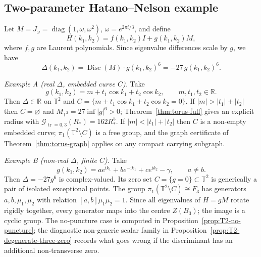 \documentclass[11pt]{article}
\numberwithin{equation}{section}
\DeclareMathOperator{\Disc}{Disc}
\DeclareMathOperator{\tr}{tr}
\DeclareMathOperator{\diag}{diag}
\newcommand{\bbR}{\mathbb R}
\newcommand{\bbT}{\mathbb T}
\newcommand{\cG}{\mathcal G}
\newcommand{\ii}{\mathrm i}
\begin{document}
\subsection{Two-parameter Hatano--Nelson example}

Let \(M=J_\omega=\diag(1,\omega,\omega^2)\), \(\omega=e^{2\pi i/3}\), and
define
\[
  H(k_1,k_2)=f(k_1,k_2)I+g(k_1,k_2)M,
\]
where \(f,g\) are Laurent polynomials.  Since eigenvalue differences
scale by \(g\), we have
\[
  \Delta(k_1,k_2)=\Disc(M)\cdot g(k_1,k_2)^6=-27\,g(k_1,k_2)^6.
\]

\emph{Example A (real \(\Delta\), embedded curve \(C\)).}
Take
\[
  g(k_1,k_2)=m+t_1\cos k_1+t_2\cos k_2,\qquad m,t_1,t_2\in\bbR.
\]
Then \(\Delta\in\bbR\) on \(\bbT^2\) and
\(C=\{m+t_1\cos k_1+t_2\cos k_2=0\}\).
If \(|m|>|t_1|+|t_2|\) then \(C=\varnothing\) and \(M_{\bbT^2}=27\inf|g|^6>0\);
Theorem~\ref{thm:torus-full} gives an explicit radius with
\(\cG_{\tr=0,3}(R_*)=162R_*^5\).
If \(|m|<|t_1|+|t_2|\) then \(C\) is a non-empty embedded curve;
\(\pi_1(\bbT^2\setminus C)\) is a free group, and the graph certificate
of Theorem~\ref{thm:torus-graph} applies on any compact carrying subgraph.

\emph{Example B (non-real \(\Delta\), finite \(C\)).}
Take
\[
  g(k_1,k_2)=ae^{\ii k_1}+be^{-\ii k_1}+ce^{\ii k_2}-\gamma,\qquad a\ne b.
\]
Then \(\Delta=-27g^6\) is complex-valued.  Its zero set
\(C=\{g=0\}\subset\bbT^2\) is generically a pair of isolated exceptional
points.  The group \(\pi_1(\bbT^2\setminus C)\cong F_3\) has generators
\(a,b,\mu_1,\mu_2\) with relation \([a,b]\mu_1\mu_2=1\).
Since all eigenvalues of \(H=gM\) rotate rigidly together, every generator
maps into the centre \(Z(B_3)\); the image is a cyclic group.
The no-puncture case is computed in
Proposition~\ref{prop:T2-no-puncture}; the diagnostic non-generic scalar
family in Proposition~\ref{prop:T2-degenerate-three-zero} records what goes
wrong if the discriminant has an additional non-transverse zero.
\end{document}
